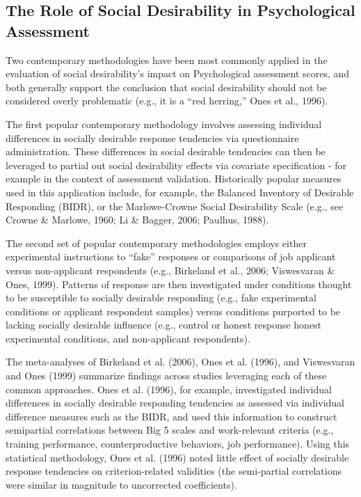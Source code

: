 \documentclass[
  ,jou]{apa6}
\begin{document}
\hypertarget{the-role-of-social-desirability-in-psychological-assessment}{%
\subsection{The Role of Social Desirability in Psychological Assessment}\label{the-role-of-social-desirability-in-psychological-assessment}}

Two contemporary methodologies have been most commonly applied in the evaluation of social desirability's impact on Psychological assessment scores, and both generally support the conclusion that social desirability should not be considered overly problematic (e.g., it is a ``red herring,'' Ones et al., 1996).

The first popular contemporary methodology involves assessing individual differences in socially desirable response tendencies via questionnaire administration. These differences in social desirable tendencies can then be leveraged to partial out social desirability effects via covariate specification - for example in the context of assessment validation. Historically popular measures used in this application include, for example, the Balanced Inventory of Desirable Responding (BIDR), or the Marlowe-Crowne Social Desirability Scale (e.g., see Crowne \& Marlowe, 1960; Li \& Bagger, 2006; Paulhus, 1988).

The second set of popular contemporary methodologies employs either experimental instructions to ``fake'' responses or comparisons of job applicant versus non-applicant respondents (e.g., Birkeland et al., 2006; Viswesvaran \& Ones, 1999). Patterns of response are then investigated under conditions thought to be susceptible to socially desirable responding (e.g., fake experimental conditions or applicant respondent samples) versus conditions purported to be lacking socially desirable influence (e.g., control or honest response honest experimental conditions, and non-applicant respondents).

The meta-analyses of Birkeland et al. (2006), Ones et al. (1996), and Viswesvaran and Ones (1999) summarize findings across studies leveraging each of these common approaches. Ones et al. (1996), for example, investigated individual differences in socially desirable responding tendencies as assessed via individual difference measures such as the BIDR, and used this information to construct semipartial correlations between Big 5 scales and work-relevant criteria (e.g., training performance, counterproductive behaviors, job performance). Using this statistical methodology, Ones et al. (1996) noted little effect of socially desirable response tendencies on criterion-related validities (the semi-partial correlations were similar in magnitude to uncorrected coefficients).
\end{document}
